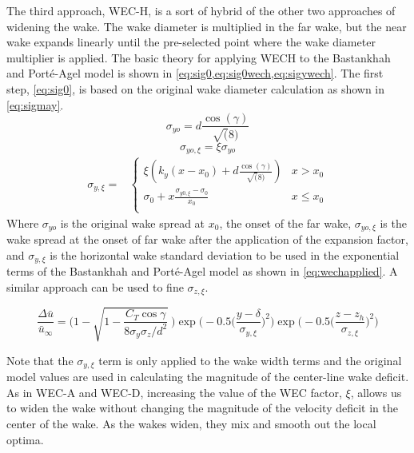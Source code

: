 \documentclass[a4paper]{jpconf}
\begin{document}
The third approach, WEC-H, is a sort of hybrid of the other two approaches of widening the wake. The wake diameter is multiplied in the far wake, but the near wake expands linearly until the pre-selected point where the wake diameter multiplier is applied. The basic theory for applying WECH to the Bastankhah and Port\'{e}-Agel model is shown in \cref{eq:sig0,eq:sig0wech,eq:sigywech}. The first step, \cref{eq:sig0}, is based on the original wake diameter calculation as shown in \cref{eq:sigmay}.
%
\begin{equation}\label{eq:sig0}
\sigma_{yo} = d\frac{\cos(\gamma)}{\sqrt(8)}
\end{equation}
%
\begin{equation}\label{eq:sig0wech}
\sigma_{yo,\xi} = \xi \sigma_{yo}
\end{equation}
%
\begin{align}\label{eq:sigywech}
\sigma_{y,\xi} = &
\begin{cases}
\xi (k_y (x-x_0) + d \frac{\cos(\gamma)}{\sqrt(8)}) & x > x_0 \\
\sigma_0 + x \frac{\sigma_{y0,\xi}-\sigma_0}{x_0} & x \le x_0 \\
\end{cases}
\end{align}
%
Where $\sigma_{yo}$ is the original wake spread at $x_0$, the onset of the far wake, $\sigma_{yo,\xi}$ is the wake spread at the onset of far wake after the application of the expansion factor, and $\sigma_{y,\xi}$ is the horizontal wake standard deviation to be used in the exponential terms of the Bastankhah and Port\'{e}-Agel model as shown in \cref{eq:wechapplied}. A similar approach can be used to fine $\sigma_{z,\xi}$.

\begin{equation}
\frac{\Delta \bar{u}}{\bar{u}_{\infty}} = \Bigg(1-\sqrt{1-\frac{C_T \cos{\gamma}}{8 \sigma_y \sigma_z/d^2}}~\Bigg) \exp{\bigg(-0.5\Big(\frac{y-\delta}{ \sigma_{y,\xi}}\Big)^2\bigg)}\exp{\bigg(-0.5\Big(\frac{z-z_h}{ \sigma_{z,\xi}}\Big)^2\bigg)}
\label{eq:wechapplied}
\end{equation}

Note that the $\sigma_{y,\xi}$ term is only applied to the wake width terms and the original model values are used in calculating the magnitude of the center-line wake deficit. As in WEC-A and WEC-D, increasing the value of the WEC factor, $\xi$, allows us to widen the wake without changing the magnitude of the velocity deficit in the center of the wake. As the wakes widen, they mix and smooth out the local optima. 
\end{document}
